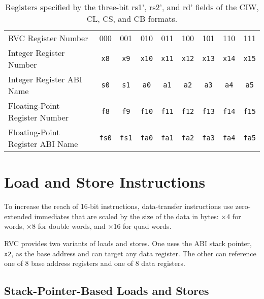 \begin{table}[H]
{
\begin{center}
\begin{tabular}{l|c|c|c|c|c|c|c|c|}
\cline{2-9}
RVC Register Number  & 000 & 001 & 010 & 011 & 100 & 101 & 110 & 111
\\ \cline{2-9}
Integer Register Number & {\tt x8} & {\tt x9} & {\tt x10} & {\tt x11} & {\tt x12} & {\tt x13} & {\tt x14}  & {\tt x15} \\ \cline{2-9}
Integer Register ABI Name    & {\tt s0}  &  {\tt s1} &  {\tt a0} &  {\tt a1} &  {\tt a2} &  {\tt a3} & {\tt a4}  & {\tt a5} \\ \cline{2-9}
Floating-Point Register Number & {\tt f8} & {\tt f9} & {\tt f10} & {\tt f11} & {\tt f12} & {\tt f13} & {\tt f14}  & {\tt f15} \\ \cline{2-9}
Floating-Point Register ABI Name    & {\tt fs0}  &  {\tt fs1} &  {\tt fa0} &  {\tt fa1} &  {\tt fa2} &  {\tt fa3} & {\tt fa4}  & {\tt fa5} \\ \cline{2-9}
\end{tabular}
\end{center}
}
\caption{Registers specified by the three-bit rs1', rs2', and rd' fields of the CIW, CL, CS, and CB formats.}
\label{registers}
\end{table}

\section{Load and Store Instructions}

To increase the reach of 16-bit instructions, data-transfer
instructions use zero-extended immediates that are scaled by the size
of the data in bytes: $\times$4 for words, $\times$8 for double words,
and $\times$16 for quad words.

RVC provides two variants of loads and stores.  One uses the ABI stack
pointer, {\tt x2}, as the base address and can target any data register.  The
other can reference one of 8 base address registers and one of 8 data
registers.

\subsection*{Stack-Pointer-Based Loads and Stores}

